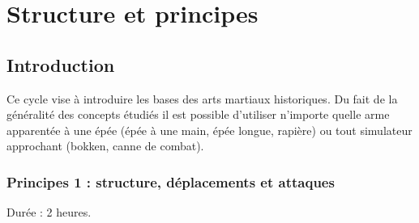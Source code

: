 \section{Structure et principes}


\subsection{Introduction}


Ce cycle vise à introduire les bases des arts martiaux historiques.
Du fait de la généralité des concepts étudiés il est possible d'utiliser n'importe quelle arme apparentée à une épée (épée à une main, épée longue, rapière) ou tout simulateur approchant (bokken, canne de combat).


\subsubsection{Principes 1 : structure, déplacements et attaques}


Durée : 2 heures.


